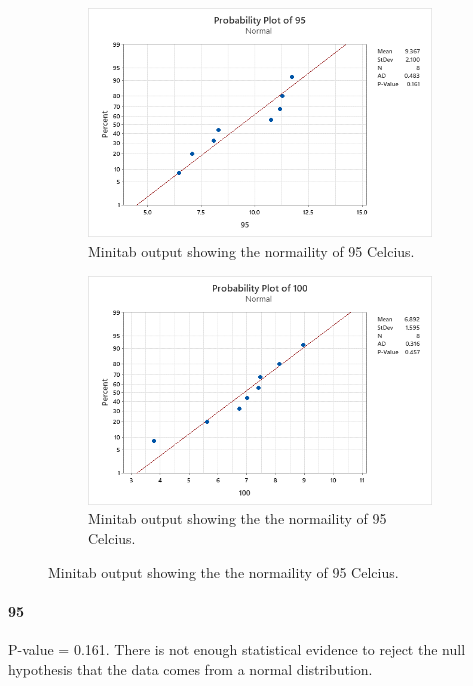 \documentclass{article}
\begin{document}
\begin{figure}[h]
    \centering
    \begin{subfigure}[b]{0.4\textwidth}
        \includegraphics[width=1.25\textwidth]{./hw_1/images/5_d.png}
        \caption{Minitab output showing the normaility of 95 Celcius.}
      \label{fig:img1}
    \end{subfigure}
    \hfill
    \begin{subfigure}[b]{0.4\textwidth}
        \includegraphics[width=1.25\textwidth]{./hw_1/images/5_e.png}
        \caption{Minitab output showing the the normaility of 95 Celcius.}
      \label{fig:img2}
    \end{subfigure}
    \label{fig:both}
  \end{figure}

\paragraph{95} P-value = 0.161. There is not enough statistical evidence to reject the null hypothesis that the data comes from a normal distribution.
\end{document}
